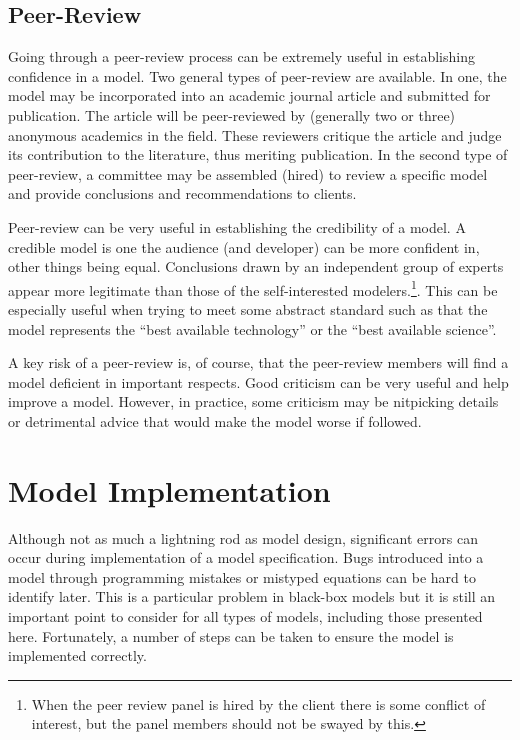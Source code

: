 \documentclass[]{memoir}
\begin{document}
\subsection{Peer-Review}

Going through a peer-review process can be extremely useful in
establishing confidence in a model. Two general types of peer-review are
available. In one, the model may be incorporated into an academic
journal article and submitted for publication. The article will be
peer-reviewed by (generally two or three) anonymous academics in the
field. These reviewers critique the article and judge its contribution
to the literature, thus meriting publication. In the second type of
peer-review, a committee may be assembled (hired) to review a specific
model and provide conclusions and recommendations to clients.

Peer-review can be very useful in establishing the credibility of a
model. A credible model is one the audience (and developer) can be more
confident in, other things being equal. Conclusions drawn by an
independent group of experts appear more legitimate than those of the
self-interested modelers.\footnote{When the peer review panel is hired
  by the client there is some conflict of interest, but the panel
  members should not be swayed by this.}. This can be especially useful
when trying to meet some abstract standard such as that the model
represents the ``best available technology'' or the ``best available
science''.

A key risk of a peer-review is, of course, that the peer-review members
will find a model deficient in important respects. Good criticism can be
very useful and help improve a model. However, in practice, some
criticism may be nitpicking details or detrimental advice that would
make the model worse if followed.

\section{Model Implementation}

Although not as much a lightning rod as model design, significant errors
can occur during implementation of a model specification. Bugs
introduced into a model through programming mistakes or mistyped
equations can be hard to identify later. This is a particular problem in
black-box models but it is still an important point to consider for all
types of models, including those presented here. Fortunately, a number
of steps can be taken to ensure the model is implemented correctly.
\end{document}
